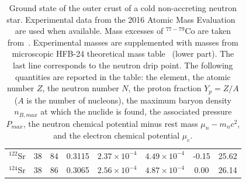 \begin{table}[!t]
\begin{center}
\begin{tabular}{cccccccc}
  $^{122}$Sr & 38  & 84  & 0.3115 & $2.37\times 10^{-4}$ & $4.49\times 10^{-4}$
            & -0.15 & 25.62 \\
  $^{124}$Sr & 38  & 86  & 0.3065 & $2.56\times 10^{-4}$ & $4.87\times 10^{-4}$
            & 0.00 & 26.14 \\
  \bottomrule
  \bottomrule
\end{tabular}
\end{center}
\caption[Ground state of the outer crust]{Ground state of the outer crust of a 
  cold non-accreting neutron star. 
Experimental data from the 2016 Atomic Mass Evaluation~\cite{Huang2017} are
used when available. Mass excesses of
$^{77-79}$Co are taken from~\cite{Welker2017}. Experimental masses are 
supplemented with masses from
microscopic HFB-24 theoretical mass table~\cite{Goriely2013} (lower part). The
last line corresponds to the neutron drip point. The following quantities are
reported in the table: the element, the atomic number $Z$, the neutron number
$N$, the proton fraction $Y_p = Z/A$ ($A$ is the number of nucleons), the 
maximum baryon density $n_{B,max}$ at
which the nuclide is found, the associated pressure $P_{max}$, the neutron
chemical potential minus rest mass $\mu_n - m_nc^2$, and the electron chemical
potential $\mu_e$.}\label{table:ocrust} 
\end{table}

